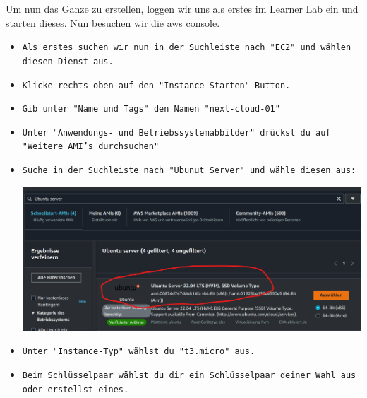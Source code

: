 \documentclass{article}
\begin{document}
\noindent Um nun das Ganze zu erstellen, loggen wir uns als erstes im Learner Lab ein und starten dieses. Nun besuchen wir die aws console.

\begin{itemize}
\item \texttt{Als erstes suchen wir nun in der Suchleiste nach "EC2" und wählen diesen Dienst aus.} \\

\item \texttt{Klicke rechts oben auf den "Instance Starten"-Button.} \\

\item \texttt{Gib unter "Name und Tags" den Namen "next-cloud-01" } \\

\item \texttt{Unter "Anwendungs- und Betriebssystemabbilder" drückst du auf "Weitere AMI's durchsuchen"} \\

\item \texttt{Suche in der Suchleiste nach "Ubunut Server" und wähle diesen aus:
} \\

\begin{center}
    \includegraphics[width=13cm]{images/nextcloud_1.png}
\end{center}

\clearpage

\item \texttt{Unter "Instance-Typ" wählst du "t3.micro" aus.} \\

\item \texttt{Beim Schlüsselpaar wählst du dir ein Schlüsselpaar deiner Wahl aus oder erstellst eines.} \\


\end{itemize}
\end{document}
